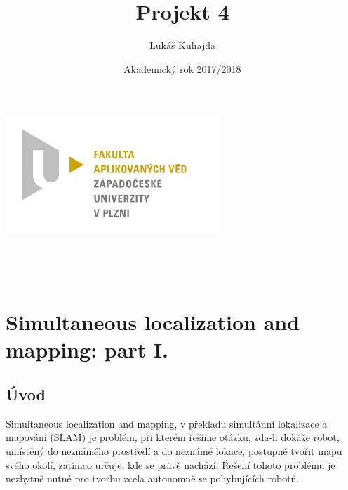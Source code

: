 \documentclass[11pt]{article}
\begin{document}
\title{Projekt 4}
\author{Lukáš Kuhajda}
\date{Akademický rok 2017/2018}
\begin{titlepage}
	\begin{center}
		\includegraphics[scale=0.5]{logo_zcu}\\
		\vspace{5cm}
		\begin{Large}
			\textbf{\thetitle}\\
		\end{Large}
		
		\vspace{3cm}
		\theauthor\\
		\vspace{5cm}
		\thedate
	\end{center}
\end{titlepage}
\newpage	
	
\tableofcontents
\newpage



\section{Simultaneous localization and mapping: part I.}

\subsection{Úvod}
Simultaneous localization and mapping, v překladu simultánní lokalizace a mapování (SLAM) je problém, při kterém řešíme otázku, zda-li dokáže robot, umístěný do neznámého prostředí a do neznámé lokace, postupně tvořit mapu svého okolí, zatímco určuje, kde se právě nachází. Řešení tohoto problému je nezbytně nutné pro tvorbu zcela autonomně se pohybujících robotů. \\
\end{document}
